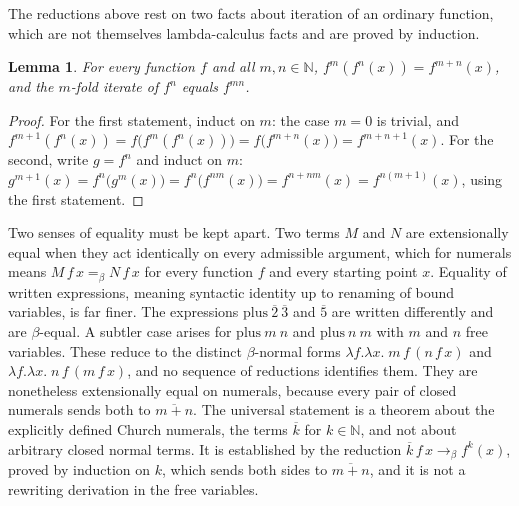 \documentclass[11pt]{article}
\newtheorem{lemma}{Lemma}
\theoremstyle{definition}
\theoremstyle{remark}
\newcommand{\cn}[1]{\overline{#1}}
\begin{document}
The reductions above rest on two facts about iteration of an ordinary function, which are not themselves lambda-calculus facts and are proved by induction.

\begin{lemma}\label{lem:iter}
For every function $f$ and all $m, n \in \mathbb{N}$, $f^{m}(f^{n}(x)) = f^{m+n}(x)$, and the $m$-fold iterate of $f^{n}$ equals $f^{mn}$.
\end{lemma}

\begin{proof}
For the first statement, induct on $m$: the case $m = 0$ is trivial, and $f^{m+1}(f^{n}(x)) = f\big(f^{m}(f^{n}(x))\big) = f\big(f^{m+n}(x)\big) = f^{m+n+1}(x)$. For the second, write $g = f^{n}$ and induct on $m$: $g^{m+1}(x) = f^{n}\big(g^{m}(x)\big) = f^{n}\big(f^{nm}(x)\big) = f^{n + nm}(x) = f^{n(m+1)}(x)$, using the first statement.
\end{proof}

Two senses of equality must be kept apart. Two terms $M$ and $N$ are extensionally equal when they act identically on every admissible argument, which for numerals means $M\,f\,x =_\beta N\,f\,x$ for every function $f$ and every starting point $x$. Equality of written expressions, meaning syntactic identity up to renaming of bound variables, is far finer. The expressions $\mathrm{plus}\ \cn{2}\ \cn{3}$ and $\cn{5}$ are written differently and are $\beta$-equal. A subtler case arises for $\mathrm{plus}\ m\ n$ and $\mathrm{plus}\ n\ m$ with $m$ and $n$ free variables. These reduce to the distinct $\beta$-normal forms $\lambda f.\lambda x.\; m\,f\,(n\,f\,x)$ and $\lambda f.\lambda x.\; n\,f\,(m\,f\,x)$, and no sequence of reductions identifies them. They are nonetheless extensionally equal on numerals, because every pair of closed numerals sends both to $\cn{m+n}$. The universal statement is a theorem about the explicitly defined Church numerals, the terms $\cn{k}$ for $k \in \mathbb{N}$, and not about arbitrary closed normal terms. It is established by the reduction $\cn{k}\,f\,x \to_\beta f^{k}(x)$, proved by induction on $k$, which sends both sides to $\cn{m+n}$, and it is not a rewriting derivation in the free variables.
\end{document}
